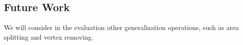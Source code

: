 \documentclass[ijgi,article,submit,moreauthors,pdftex]{Definitions/mdpi}
\begin{document}
\subsection{Future Work}

We will consider in the evaluation 
other generalization operations, 
such as area splitting and vertex removing.









%
%
%
%
%
\end{document}
